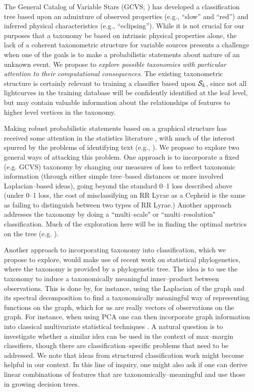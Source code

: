 The General Catalog of Variable Stars (GCVS; \citealt{ksf+96}) has developed a
classification tree based upon an admixture of observed properties (e.g.,
``slow'' and ``red'') and inferred physical characteristics (e.g.,
``eclipsing'').  While it is not crucial for our purposes that a taxonomy be
based on intrinsic physical properties alone, the lack of a coherent
taxonometric structure for variable sources presents a challenge when one of the
goals is to make a probabilistic statements about nature of an unknown event. We
propose to {\it explore possible taxonomies with particular attention to their
computational consequences}.  The existing taxonometric structure is certainly
relevant to training a classifier based upon ${\cal S}_k$, since not all
lightcurves in the training database will be confidently identified at the leaf
level, but may contain valuable information about the relationships of features
to higher level vertices in the taxonomy.

Making robust probabilistic statements based on a graphical structure has
received some attention in the statistics literature
\citep{DBLP:conf/icml/KollerS97,DBLP:conf/icdm/SunL01,DBLP:conf/icml/DekelKS04,
CesaBianchi06,  bcmt-lmmsc-04}, with much of the interest spurred by the
problems of identifying text (e.g., \citealt{593971}). We propose to explore two
general ways of attacking this problem. One approach is to incorporate a fixed
(e.g. GCVS) taxonomy by changing our measures of loss to reflect taxonomic
information (through either simple tree--based distances or more involved
Laplacian--based ideas), going beyond the standard 0--1 loss described above
(under 0--1 loss, the cost of misclassifying an RR Lyrae as a Cepheid is the
same as failing to distinguish between two types of RR Lyrae.) Another approach
addresses the taxonomy by doing a ``multi--scale" or ``multi--resolution"
classification.  Much of the exploration here will be in finding the optimal
metrics on the tree (e.g. \citealt{ChungSpectralGraphTheoryBook97}).

Another approach to incorporating taxonomy into classification, which we propose
to explore, would make use of recent work on statistical phylogenetics, where
the taxonomy is provided by a phylogenetic tree\citep{elithesis}.  The idea is
to use the taxonomy to induce a taxonomically meaningful inner--product between
observations. This is done by, for instance, using the Laplacian of the graph
and its spectral decomposition to find a taxonomically meaningful way of
representing functions on the graph, which for us are really vectors of
observations on the graph. For instance, when using PCA one can then incorporate
graph information into classical multivariate statistical techniques
\cite{PurdomAnalyzingDataWithGraphs08}.  A natural question is to investigate
whether a similar idea can be used in the context of max--margin classifiers,
though there are classification--specific problems that need to be addressed. We
note that ideas from structured classification work \citep{bcmt-lmmsc-04} might
become helpful in our context. In this line of inquiry, one might also ask if
one can derive linear combinations of features that are
taxonomically--meaningful and use those in growing decision trees.

